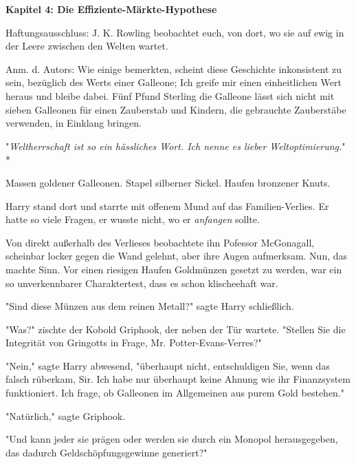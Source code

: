 

\hypertarget{die-effiziente-muxe4rkte-hypothese}{%

\textbf{Kapitel 4: Die Effiziente-Märkte-Hypothese}

Haftungsausschluss: J. K. Rowling beobachtet euch, von dort, wo sie auf ewig in der Leere zwischen den Welten wartet.

Anm. d. Autors: Wie einige bemerkten, scheint diese Geschichte inkonsistent zu sein, bezüglich des Werts einer Galleone; Ich greife mir einen einheitlichen Wert heraus und bleibe dabei. Fünf Pfund Sterling die Galleone lässt sich nicht mit sieben Galleonen für einen Zauberstab und Kindern, die gebrauchte Zauberstäbe verwenden, in Einklang bringen.

\later

"\emph{Weltherrschaft ist so ein hässliches Wort. Ich nenne es lieber Weltoptimierung.}" *

\later

Massen goldener Galleonen. Stapel silberner Sickel. Haufen bronzener Knuts.

Harry stand dort und starrte mit offenem Mund auf das Familien-Verlies. Er hatte so viele Fragen, er wusste nicht, wo er \emph{anfangen} sollte.

Von direkt außerhalb des Verlieses beobachtete ihn Pofessor McGonagall, scheinbar locker gegen die Wand gelehnt, aber ihre Augen aufmerksam. Nun, das machte Sinn. Vor einen riesigen Haufen Goldmünzen gesetzt zu werden, war ein so unverkennbarer Charaktertest, dass es schon klischeehaft war.

"Sind diese Münzen aus dem reinen Metall?" sagte Harry schließlich.

"Was?" zischte der Kobold Griphook, der neben der Tür wartete. "Stellen Sie die Integrität von Gringotts in Frage, Mr. Potter-Evans-Verres?"

"Nein," sagte Harry abwesend, "überhaupt nicht, entschuldigen Sie, wenn das falsch rüberkam, Sir. Ich habe nur überhaupt keine Ahnung wie ihr Finanzsystem funktioniert. Ich frage, ob Galleonen im Allgemeinen aus purem Gold bestehen."

"Natürlich," sagte Griphook.

"Und kann jeder sie prägen oder werden sie durch ein Monopol herausgegeben, das dadurch Geldschöpfungsgewinne generiert?"

}
